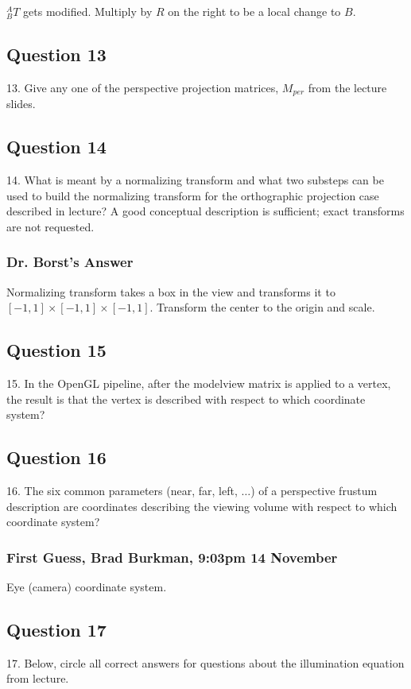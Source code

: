 \documentclass[11pt]{article}
\begin{document}
\begin{spacing}{1.2}
$^A_BT$ gets modified.  Multiply by $R$ on the right to be a local change to $B$.  


\subsection{Question 13}
13.  Give any one of the perspective projection matrices, $M_{per}$ from the lecture slides.  

\subsection{Question 14}
14.  What is meant by a normalizing transform and what two substeps can be used to build the normalizing transform for the orthographic projection case described in lecture?  A good conceptual description is sufficient; exact transforms are not requested.

\subsubsection{Dr. Borst's Answer}

Normalizing transform takes a box in the view and transforms it to $[-1,1]\times [-1,1] \times [-1,1]$.  Transform the center to the origin and scale.  

\subsection{Question 15}
15.  In the OpenGL pipeline, after the modelview matrix is applied to a vertex, the result is that the vertex is described with respect to which coordinate system?

\subsection{Question 16}
16.  The six common parameters (near, far, left, $\dots$) of a perspective frustum description are coordinates describing the viewing volume with respect to which coordinate system?

\subsubsection{First Guess, Brad Burkman, 9:03pm 14 November}

Eye (camera) coordinate system.

\subsection{Question 17}
17.  Below, circle all correct answers for questions about the illumination equation from lecture.  


\end{spacing}
\end{document}
